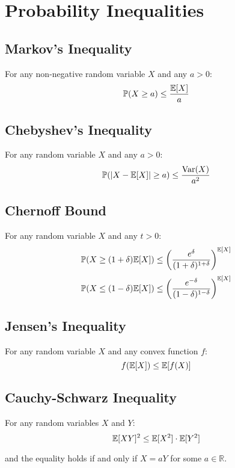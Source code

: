 \section{Probability Inequalities}
\subsection{Markov's Inequality}
For any non-negative random variable $X$ and any $a > 0$:
\[
    \mathbb{P}(X \geq a) \leq \frac{\mathbb{E}[X]}{a}
\]
\subsection{Chebyshev's Inequality}
For any random variable $X$ and any $a > 0$:
\[
    \mathbb{P}(|X - \mathbb{E}[X]| \geq a) \leq \frac{\text{Var}(X)}{a^2}
\]
\subsection{Chernoff Bound}
For any random variable $X$ and any $t > 0$:
\[
    \mathbb{P}(X \geq (1 + \delta) \mathbb{E}[X]) \leq \left( \frac{e^{\delta}}{(1 + \delta)^{1 + \delta}} \right)^{\mathbb{E}[X]}
\]
\[
    \mathbb{P}(X \leq (1 - \delta) \mathbb{E}[X]) \leq \left( \frac{e^{-\delta}}{(1 - \delta)^{1 - \delta}} \right)^{\mathbb{E}[X]}
\]
\subsection{Jensen's Inequality}
For any random variable $X$ and any convex function $f$:
\[
    f(\mathbb{E}[X]) \leq \mathbb{E}[f(X)]
\]
\subsection{Cauchy-Schwarz Inequality}
For any random variables $X$ and $Y$:
\[
    \mathbb{E}[XY]^2 \leq \mathbb{E}[X^2] \cdot \mathbb{E}[Y^2]
\]

and the equality holds if and only if $X = aY$ for some $a \in \mathbb{R}$.

